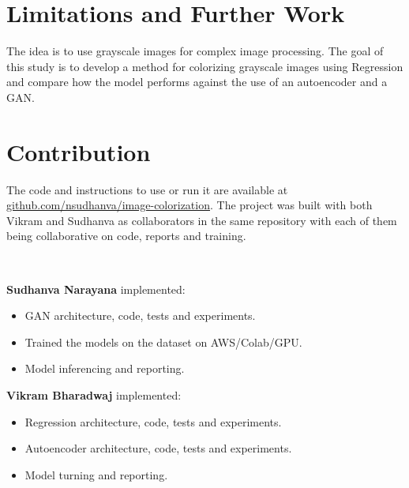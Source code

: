 \documentclass{article}
\begin{document}
\section{Limitations and Further Work}
The idea is to use grayscale images for complex image processing. The goal of this
study is to develop a method for colorizing grayscale images using Regression and
compare how the model performs against the use of an autoencoder and a GAN. 

\section{Contribution}

The code and instructions to use or run it are available at \url{github.com/nsudhanva/image-colorization}. 
The project was built with both Vikram and Sudhanva as collaborators in the same repository with each of them being collaborative on code, reports and training.

\

\textbf{Sudhanva Narayana} implemented:
\begin{itemize}
\item GAN architecture, code, tests and experiments.
\item Trained the models on the dataset on AWS/Colab/GPU.
\item Model inferencing and reporting.
\end{itemize}



\textbf{Vikram Bharadwaj} implemented:
\begin{itemize}
\item Regression architecture, code, tests and experiments.
\item Autoencoder architecture, code, tests and experiments.
\item Model turning and reporting.
\end{itemize}

\cite{1}
\cite{2}
\cite{4}
\cite{5}
\cite{6}
\cite{7}
\cite{8}


\end{document}
